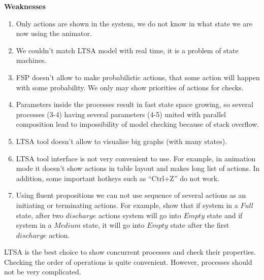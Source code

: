 \documentclass{article}
\begin{document}
\begin{enumerate}
\begin{enumerate}
\end{enumerate}
\textbf{Weaknesses}
\begin{enumerate}
\item Only actions are shown in the system, we do not know in what state we are now using the animator.
\item We couldn’t match LTSA model with real time, it is a problem of state machines. 
\item 	FSP doesn’t allow to make probabilistic actions, that some action will happen with some probability. We only may show priorities of actions for checks.
\item 	Parameters inside the processes result in fast state space growing, so several processes (3-4) having several parameters (4-5) united with parallel composition lead to impossibility of model checking because of stack overflow.
\item 	LTSA tool doesn’t allow to visualise big graphs (with many states).
\item 	LTSA tool interface is not very convenient to use. For example, in animation mode it doesn’t show actions in table layout and makes long list of actions. In addition, some important hotkeys such as “Ctrl+Z” do not work.
\item 	Using fluent propositions we can not use sequence of several actions as an initiating or terminating actions. For example, show that if system in a $Full$ state, after two $discharge$ actions system will go into $Empty$ state and if system in a $Medium$ state, it will go into $Empty$ state after the first $discharge$ action.
	
\end{enumerate}

LTSA is the best choice to show concurrent processes and check their properties. Checking the order of operations is quite convenient. However, processes should not be very complicated.

\end{enumerate}
\end{document}
